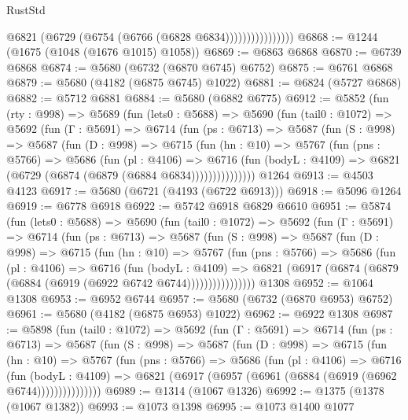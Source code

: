 \begin{lexlean}{RustStd}
\begin{coremodule}
                          @6821 (@6729 (@6754 (@6766 (@6828 @6834))))))))))))))))
@6868 := @1244 (@1675 (@1048 (@1676 @1015) @1058))
@6869 := @6863 @6868
@6870 := @6739 @6868
@6874 := @5680 (@6732 (@6870 @6745) @6752)
@6875 := @6761 @6868
@6879 := @5680 (@4182 (@6875 @6745) @1022)
@6881 := @6824 (@5727 @6868)
@6882 := @5712 @6881
@6884 := @5680 (@6882 @6775)
@6912 := @5852
    (fun (rty : @998) =>
    @5689
      (fun (lets0 : @5688) =>
      @5690
        (fun (tail0 : @1072) =>
        @5692
          (fun (Γ : @5691) =>
          @6714
            (fun (ps : @6713) =>
            @5687
              (fun (S : @998) =>
              @5687
                (fun (D : @998) =>
                @6715
                  (fun (hn : @10) =>
                  @5767
                    (fun (pns : @5766) =>
                    @5686
                      (fun (pl : @4106) =>
                      @6716
                        (fun (bodyL : @4109) =>
                        @6821 (@6729 (@6874 (@6879 (@6884 @6834)))))))))))))))
    @1264
@6913 := @4503 @4123
@6917 := @5680 (@6721 (@4193 (@6722 @6913)))
@6918 := @5096 @1264
@6919 := @6778 @6918
@6922 := @5742 @6918 @6829 @6610
@6951 := @5874
    (fun (lets0 : @5688) =>
    @5690
      (fun (tail0 : @1072) =>
      @5692
        (fun (Γ : @5691) =>
        @6714
          (fun (ps : @6713) =>
          @5687
            (fun (S : @998) =>
            @5687
              (fun (D : @998) =>
              @6715
                (fun (hn : @10) =>
                @5767
                  (fun (pns : @5766) =>
                  @5686
                    (fun (pl : @4106) =>
                    @6716
                      (fun (bodyL : @4109) =>
                      @6821 (@6917 (@6874 (@6879 (@6884 (@6919 (@6922 @6742 @6744))))))))))))))))
    @1308
@6952 := @1064 @1308
@6953 := @6952 @6744
@6957 := @5680 (@6732 (@6870 @6953) @6752)
@6961 := @5680 (@4182 (@6875 @6953) @1022)
@6962 := @6922 @1308
@6987 := @5898
    (fun (tail0 : @1072) =>
    @5692
      (fun (Γ : @5691) =>
      @6714
        (fun (ps : @6713) =>
        @5687
          (fun (S : @998) =>
          @5687
            (fun (D : @998) =>
            @6715
              (fun (hn : @10) =>
              @5767
                (fun (pns : @5766) =>
                @5686
                  (fun (pl : @4106) =>
                  @6716
                    (fun (bodyL : @4109) =>
                    @6821 (@6917 (@6957 (@6961 (@6884 (@6919 (@6962 @6744)))))))))))))))
@6989 := @1314 (@1067 @1326)
@6992 := @1375 (@1378 (@1067 @1382))
@6993 := @1073 @1398
@6995 := @1073 @1400 @1077

\end{coremodule}
\end{lexlean}
